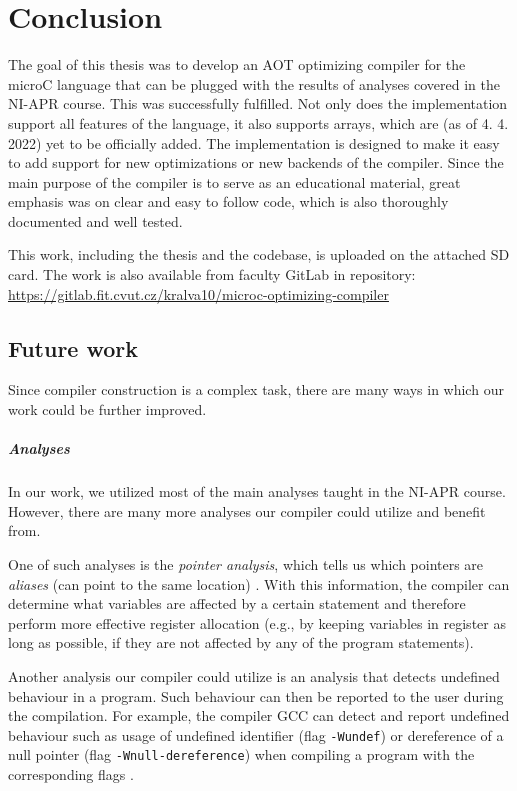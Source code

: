\documentclass[thesis=M,english]{FITthesis}[2019/12/23]
\begin{document}


\chapter{Conclusion}
The goal of this thesis was to develop an AOT optimizing compiler for the microC language that can be plugged with the results of analyses covered in the NI-APR course. This was successfully fulfilled. Not only does the implementation support all features of the language, it also supports arrays, which are (as of 4. 4. 2022) yet to be officially added. The implementation is designed to make it easy to add support for new optimizations or new backends of the compiler. Since the main purpose of the compiler is to serve as an educational material, great emphasis was on clear and easy to follow code, which is also thoroughly documented and well tested.

This work, including the thesis and the codebase, is uploaded on the attached SD card. The work is also available from faculty GitLab in repository: \url{https://gitlab.fit.cvut.cz/kralva10/microc-optimizing-compiler}

\section*{Future work}
Since compiler construction is a complex task, there are many ways in which our work could be further improved.

\paragraph*{Analyses} In our work, we utilized most of the main analyses taught in the NI-APR course. However, there are many more analyses our compiler could utilize and benefit from.

One of such analyses is the \emph{pointer analysis}, which tells us which pointers are \emph{aliases} (can point to the same location) \cite[Chap. 12.2.2]{dragonbook}. With this information, the compiler can determine what variables are affected by a certain statement and therefore perform more effective register allocation (e.g., by keeping variables in register as long as possible, if they are not affected by any of the program statements).

Another analysis our compiler could utilize is an analysis that detects undefined behaviour in a program. Such behaviour can then be reported to the user during the compilation. For example, the compiler GCC can detect and report undefined behaviour such as usage of undefined identifier (flag \texttt{-Wundef}) or dereference of a null pointer (flag \texttt{-Wnull-dereference}) when compiling a program with the corresponding flags \cite{gcc_warning_opt}.
\end{document}
